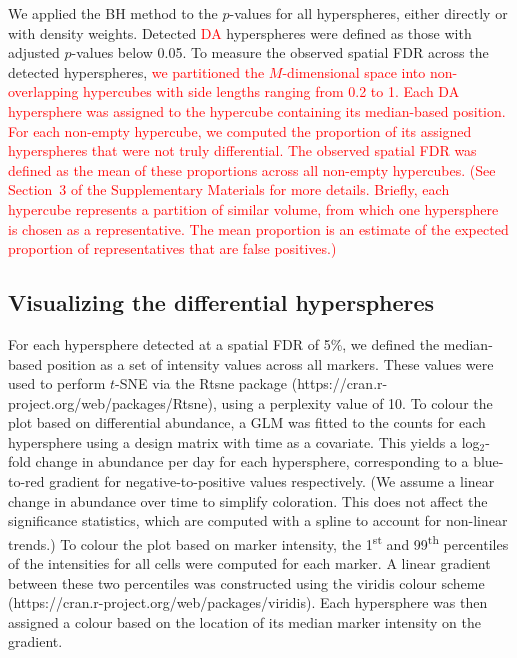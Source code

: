 \documentclass{article}
\newcommand\revised[1]{\textcolor{red}{#1}}
\newcommand{\suppfdr}{3}
\newcommand{\suppfigfdr}{4}
\begin{document}
We applied the BH method to the $p$-values for all hyperspheres, either directly or with density weights.
Detected \revised{DA} hyperspheres were defined as those with adjusted $p$-values below 0.05.
To measure the observed spatial FDR across the detected hyperspheres, \revised{we partitioned the $M$-dimensional space into non-overlapping hypercubes with side lengths ranging from 0.2 to 1.
Each DA hypersphere was assigned to the hypercube containing its median-based position.
For each non-empty hypercube, we computed the proportion of its assigned hyperspheres that were not truly differential.
The observed spatial FDR was defined as the mean of these proportions across all non-empty hypercubes.
(See Section~\suppfdr{} of the Supplementary Materials for more details.
Briefly, each hypercube represents a partition of similar volume, from which one hypersphere is chosen as a representative.
The mean proportion is an estimate of the expected proportion of representatives that are false positives.)}


\subsection{Visualizing the differential hyperspheres}
For each hypersphere detected at a spatial FDR of 5\%, we defined the median-based position as a set of intensity values across all markers.
These values were used to perform $t$-SNE via the Rtsne package (https://cran.r-project.org/web/packages/Rtsne), using a perplexity value of 10.
To colour the plot based on differential abundance, a GLM was fitted to the counts for each hypersphere using a design matrix with time as a covariate.
This yields a log$_2$-fold change in abundance per day for each hypersphere, corresponding to a blue-to-red gradient for negative-to-positive values respectively.
(We assume a linear change in abundance over time to simplify coloration.
This does not affect the significance statistics, which are computed with a spline to account for non-linear trends.)
To colour the plot based on marker intensity, the 1\textsuperscript{st} and 99\textsuperscript{th} percentiles of the intensities for all cells were computed for each marker.
A linear gradient between these two percentiles was constructed using the viridis colour scheme (https://cran.r-project.org/web/packages/viridis).
Each hypersphere was then assigned a colour based on the location of its median marker intensity on the gradient. 
\end{document}

